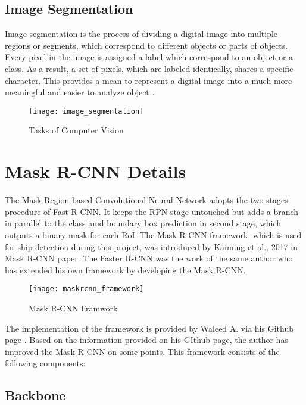 \subsection{Image Segmentation}
\label{subsec:imagesegmentation}
\noindent
Image segmentation is the process of dividing a digital image into multiple regions or segments, which correspond to different objects or parts of objects. Every pixel in the image is assigned a label which correspond to an object or a class. As a result, a set of pixels, which are labeled identically, shares a specific character. This provides a mean to represent a digital image into a much more meaningful and easier to analyze object \cite{kale2010computer}. 

\begin{figure}[t]
  \centering
  \texttt{[image: image\_segmentation]}
  \caption[Image Segmentation]
   {Tasks of Computer Vision  \cite{imgseg}}
   \label{fig:faster-rcnn}
\end{figure}


\section{Mask R-CNN Details}
\label{sec:maskrcnn-details}

The Mask Region-based Convolutional Neural Network adopts the two-stages procedure of Fast R-CNN. It keeps the RPN stage untouched but adds a branch in parallel to the class amd boundary box prediction in second stage, which outputs a binary mask for each RoI\cite{HeGDG17}. The Mask R-CNN framework, which is used for ship detection during this project, was introduced by Kaiming et al., 2017 in Mask R-CNN paper. The Faster R-CNN was the work of the same author who has extended his own framework by developing the Mask R-CNN. 

\begin{figure}[h!]
  \centering
  \texttt{[image: maskrcnn\_framework]}
  \caption[Mask R-CNN]
   {Mask R-CNN Framwork \cite{HeGDG17}}
   \label{fig:faster-rcnn}
\end{figure}
\noindent
The implementation of the framework is provided by Waleed A. via his Github page \cite{matterport_maskrcnn_2017}. Based on the information provided on his GIthub page, the author has improved the Mask R-CNN on some points. This framework consists of the following components:


\subsection{Backbone}
\label{subsec:backbone}

